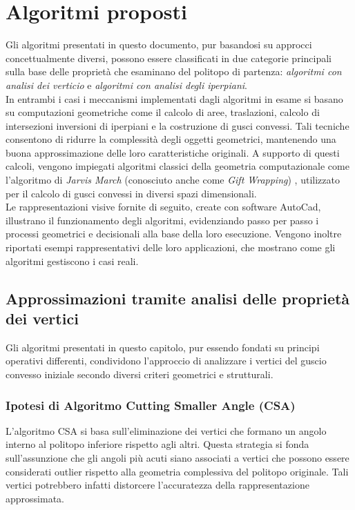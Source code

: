 \chapter{Algoritmi proposti}

Gli algoritmi presentati in questo documento, pur basandosi su approcci 
concettualmente diversi, possono essere classificati in due categorie 
principali sulla base delle proprietà che esaminano del politopo di partenza: 
\textit{algoritmi con analisi dei verticio} e 
\textit{algoritmi con analisi degli iperpiani}.\\

In entrambi i casi i meccanismi implementati dagli algoritmi in esame
si basano su computazioni geometriche come il calcolo di aree, traslazioni, calcolo di intersezioni
inversioni di iperpiani e la costruzione di gusci convessi. 
Tali tecniche consentono di ridurre la complessità degli oggetti geometrici, mantenendo una 
buona approssimazione delle loro caratteristiche originali. A supporto di questi calcoli, 
vengono impiegati algoritmi classici della geometria computazionale come l'algoritmo di 
\textit{Jarvis March} (conosciuto anche come \textit{Gift Wrapping})
\cite{JarvisMarchAlgorithm}, utilizzato per il calcolo di gusci convessi 
in diversi spazi dimensionali.\\

Le rappresentazioni visive fornite di seguito, create con software AutoCad,
illustrano il funzionamento degli algoritmi, evidenziando passo per passo i 
processi geometrici e decisionali alla base della loro esecuzione. 
Vengono inoltre riportati esempi rappresentativi delle loro applicazioni, 
che mostrano come gli algoritmi gestiscono i casi reali.

\pagebreak
\section{Approssimazioni tramite analisi delle proprietà dei vertici}
Gli algoritmi presentati in questo capitolo, pur essendo fondati su principi operativi 
differenti, condividono l'approccio di analizzare i vertici del guscio convesso iniziale 
secondo diversi criteri geometrici e strutturali.

\subsection{Ipotesi di Algoritmo Cutting Smaller Angle (CSA)}

L'algoritmo CSA si basa sull'eliminazione dei vertici che formano un angolo interno al 
politopo inferiore rispetto agli altri. Questa strategia si fonda sull'assunzione che 
gli angoli più acuti siano associati a vertici che possono essere considerati outlier 
rispetto alla geometria complessiva del politopo originale. 
Tali vertici potrebbero infatti distorcere l'accuratezza della rappresentazione approssimata.

